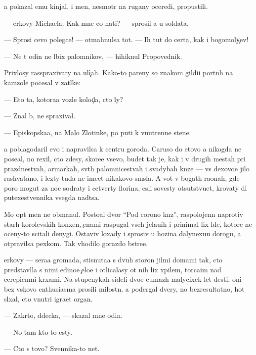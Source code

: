 \documentclass[10pt]{book}
\begin{document}
{\Y}a pokazal {\y}emu kinjal, i men{\ia}, nesmotr{\ia} na rugany oceredi, propustili.

— {\C}erkovy Michaela. Kak mne {\y}e{\y}o na{\y}ti? — sprosil {\y}a u soldata.

— Sprosi cevo polegce! — otmahnulsa tot. — Ih tut do certa, kak i bogomoly{\c}ev!

— Ne t{\yi} odin ne l{\io}bix palomnikov, — hihiknul Propovednik.

Prixlosy rasspraxivaty na uli{\c}ah. Kako{\y}-to pareny so znakom gildi{\y}i portn{\yi}h na kamzole pocesal v zat{\yi}lke:

— Eto ta, kotora{\y}a vozle kolod{\c}a, cto ly?

— Znal b{\yi}, ne spraxival.

— Episkopska{\y}a, na Malo{\y} Zlotinke, po puti k vnutrenne{\y} stene.

{\Y}a poblagodaril {\y}evo i napravilsa k centru goroda. Caruso do etovo {\y}a nikogda ne pose{\x}al, no rexil, cto zdesy, skore{\y}e vsevo, budet tak je, kak i v drugih mestah pri prazdnestvah, {\y}armarkah, sv{\ia}t{\yi}h palomnicestvah i svadybah kn{\ia}ze{\y} — vs{\e} dexovo{\y}e jil{\y}o rashvatano, i lezty tuda ne ime{\y}et nikakovo sm{\yi}sla. A vot v bogat{\yi}h ra{\y}onah, gde poro{\y} mogut za noc sodraty i cetverty florina, {\y}esli sovesty otsutstvu{\y}et, krovaty dl{\ia} putexestvennika vsegda na{\y}d{\e}tsa.

Mo{\y} op{\yi}t men{\ia} ne obmanul. Posto{\y}al{\yi}{\y} dvor ``Pod corono{\y} kn{\ia}z{\ia}", raspolojenn{\yi}{\y} naprotiv star{\yi}h korolevskih kon{\io}xen, {\c}enami raspugal vseh jela{\y}u{\x}ih i prinimal lix l{\io}de{\y}, kotor{\yi}{\y}e ne oceny-to scitali denygi. Ostaviv loxady i sprosiv u hoz{\ia}{\y}ina dalyne{\y}xu{\y}u dorogu, {\y}a otpravilsa pexkom. Tak v{\yi}hodilo gorazdo b{\yi}stre{\y}e.

{\C}erkovy — sera{\y}a gromada, stisnuta{\y}a s dvuh storon jil{\yi}mi domami tak, cto predstavl{\ia}la s nimi {\y}edino{\y}e {\c}elo{\y}e i otlicalasy ot nih lix xpilem, torca{\x}im nad cerepicn{\yi}mi kr{\yi}xami. Na stupenykah sideli dvo{\y}e cumaz{\yi}h malycixek let des{\ia}ti, oni bez vs{\ia}kovo enthusiasma prosili milost{\yi}n{\io}. {\Y}a podergal dvery, no bezresultatno, hot{\ia} sl{\yi}xal, cto vnutri igra{\y}et organ.

— Zakr{\yi}to, d{\ia}decka, — skazal mne odin.

— No tam kto-to {\y}esty.

— Cto s tovo? Sv{\ia}{\x}ennika-to net.
\end{document}
